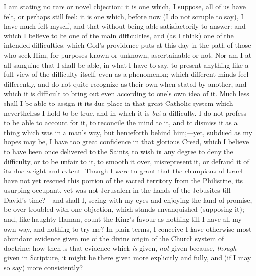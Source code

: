 I am stating no rare or novel objection: it is one which, I
suppose, all of us have felt, or perhaps still feel: it is one which,
before now (I do not scruple to say), I have much felt myself, and
that without being able satisfactorily to answer: and which I believe
to be one of the main difficulties, and (as I think) one of the
intended difficulties, which God's providence puts at this day in the
path of those who seek Him, for purposes known or unknown,
ascertainable or not. Nor am I at all sanguine that I shall be able,
in what I have to say, to present anything like a full view of the
difficulty itself, even as a phenomenon; which different minds feel
differently, and do not quite recognize as their own when stated by
another, and which it is difficult to bring out even according to one's
own idea of it. Much less shall I be able to assign it its due place
in that great Catholic system which nevertheless I hold to be true,
and in which it is \emph{but} a difficulty. I do not profess to be able to
account for it, to reconcile the mind to it, and to dismiss it
as a thing which was in a man's way, but henceforth behind him;—yet,
subdued as my hopes may be, I have too great confidence in that
glorious Creed, which I believe to have been once delivered to the
Saints, to wish in any degree to deny the difficulty, or to be unfair
to it, to smooth it over, misrepresent it, or defraud it of its due
weight and extent. Though I were to grant that the champions of Israel
have not yet rescued this portion of the sacred territory from the
Philistine, its usurping occupant, yet was not Jerusalem in the hands
of the Jebusites till David's time?—and shall I, seeing with my eyes
and enjoying the land of promise, be over-troubled with one objection,
which stands unvanquished (supposing it); and, like haughty Haman,
count the King's favour as nothing till I have all my own way, and
nothing to try me? In plain terms, I conceive I have otherwise most
abundant evidence given me of the divine origin of the Church system
of doctrine: how then is that evidence which \emph{is} given, \emph{not}
given because, \emph{though} given in Scripture, it might be there
given more explicitly and fully, and (if I may so say) more
consistently?

